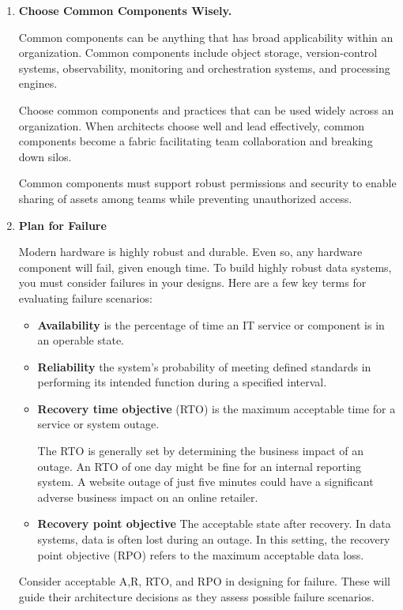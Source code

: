 \begin{enumerate}
    \item \textbf{Choose Common Components Wisely.}
    
    \noindent
    Common components can be anything that has broad applicability
    within an organization. Common components include object storage,
    version-control systems, observability, monitoring and
    orchestration systems, and processing engines.

    Choose common components and practices that can be used widely
    across an organization. When architects choose well and lead
    effectively, common components become a fabric facilitating team
    collaboration and breaking down silos.

    Common components must support robust permissions
    and security to enable sharing of assets among teams while preventing unauthorized
    access.


    \item \textbf{Plan for Failure}
    
    \noindent
    Modern hardware is highly robust and durable. Even so, any
    hardware component will fail, given enough time. To build highly
    robust data systems, you must consider failures in your designs.
    Here are a few key terms for evaluating failure scenarios:
    \begin{itemize}
        \item \textbf{Availability} is the percentage of time an IT service
        or component is in an operable state.
        
        \item \textbf{Reliability}  the system's probability of
        meeting defined standards in performing its intended
        function during a specified interval.
        
        \item \textbf{Recovery time objective} (RTO) is the maximum
        acceptable time for a service or system outage.
        
        The RTO is generally set by determining the business impact of
        an outage. An RTO of one day might be fine for an internal
        reporting system. A website outage of just five minutes could
        have a significant adverse business impact on an online
        retailer.
                
        \item \textbf{Recovery point objective} 
        The acceptable state after recovery. In data systems, data is
        often lost during an  outage. In this setting, the recovery
        point objective (RPO) refers to the maximum  acceptable data
        loss.
    \end{itemize}
    Consider acceptable A,R, RTO, and RPO in designing for failure.
    These will guide their architecture decisions as they assess
    possible failure scenarios.



\end{enumerate}
